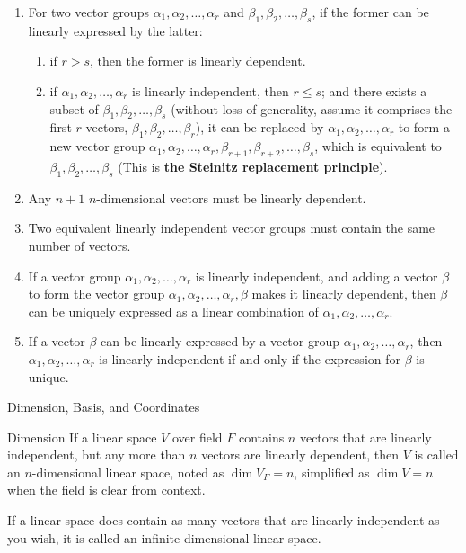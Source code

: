 \documentclass[11pt]{../../TexTemplate/elegantbook} %
\begin{document}
\begin{proposition}
\begin{enumerate}
    \item For two vector groups \( \alpha_1, \alpha_2, \dots, \alpha_r \) and \( \beta_1, \beta_2, \dots, \beta_s \),
        if the former can be linearly expressed by the latter:
        \begin{enumerate}[label=\roman*.]
            \item if \( r > s \), then the former is linearly dependent.
            \item if \( \alpha_1, \alpha_2, \dots, \alpha_r \) is linearly independent, then \( r \leqslant s \);
                and there exists a subset of \( \beta_1, \beta_2, \dots, \beta_s \) (without loss of generality, 
                assume it comprises the first \(r\) vectors, \( \beta_1, \beta_2, \dots, \beta_r \)),
                it can be replaced by \( \alpha_1, \alpha_2, \dots, \alpha_r \) to form a new vector group
                \( \alpha_1, \alpha_2, \dots, \alpha_r, \beta_{r+1}, \beta_{r+2}, \dots, \beta_s \),
                which is equivalent to \( \beta_1, \beta_2, \dots, \beta_s \) (This is \textbf{the Steinitz replacement principle}).
        \end{enumerate}

    \item Any \( n+1 \) \( n \)-dimensional vectors must be linearly dependent.
    
    \item Two equivalent linearly independent vector groups must contain the same number of vectors.

    \item If a vector group \( \alpha_1, \alpha_2, \dots, \alpha_r \) is linearly independent, 
        and adding a vector \( \beta \) to form the vector group \( \alpha_1, \alpha_2, \dots, \alpha_r, \beta \) 
        makes it linearly dependent, then \( \beta \) can be uniquely expressed as a linear combination of 
        \( \alpha_1, \alpha_2, \dots, \alpha_r \).

    \item If a vector \( \beta \) can be linearly expressed by a vector group \( \alpha_1, \alpha_2, \dots, \alpha_r \), 
        then \( \alpha_1, \alpha_2, \dots, \alpha_r \) is linearly independent
        if and only if the expression for \( \beta \) is unique.
\end{enumerate}
\end{proposition}

\begin{leftbarTitle}{Dimension, Basis, and Coordinates}\end{leftbarTitle}
\begin{definition}{Dimension}
    If a linear space \( V \) over field \(F\) contains \(n\) vectors that are linearly independent,
    but any more than \(n\) vectors are linearly dependent, 
    then \( V \) is called an \( n \)-dimensional linear space,
    noted as \( \dim V_{F} = n \), simplified as \( \dim V = n \) when the field is clear from context.

    If a linear space does contain as many vectors that are linearly independent as you wish, 
    it is called an infinite-dimensional linear space.
\end{definition}
\end{document}
